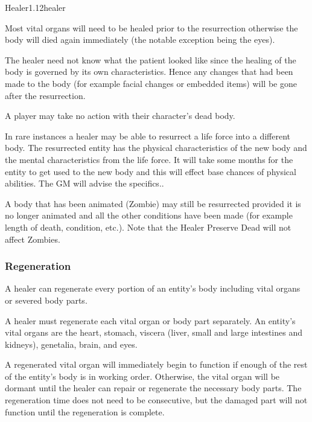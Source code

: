 \begin{skill*}{Healer}{1.12}{healer}
\begin{Enumerate}
\item
Most vital organs will need to be healed prior to the resurrection
otherwise the body will died again immediately (the notable exception
being the eyes).

\item
The healer need not know what the patient looked like since the
healing of the body is governed by its own characteristics. Hence any
changes that had been made to the body (for example facial changes or
embedded items) will be gone after the resurrection.

\item
A player may take no action with their character's dead body.

\item
In rare instances a healer may be able to resurrect a life force into
a different body. The resurrected entity has the physical
characteristics of the new body and the mental characteristics from
the life force.  It will take some months for the entity to get used
to the new body and this will effect base chances of physical
abilities.  The GM will advise the specifics..

\item
A body that has been animated (\eg Zombie) may still be resurrected
provided it is no longer animated and all the other conditions have
been made (for example length of death, condition, etc.). Note that
the Healer Preserve Dead will not affect Zombies.
\end{Enumerate}

\subsubsection{Regeneration}

A healer can regenerate every portion of an entity's body including
vital organs or severed body parts.

A healer must regenerate each vital organ or body part separately. An
entity's vital organs are the heart, stomach, viscera (liver, small
and large intestines and kidneys), genetalia, brain, and eyes.

A regenerated vital organ will immediately begin to function if enough
of the rest of the entity's body is in working order. Otherwise, the
vital organ will be dormant until the healer can repair or regenerate
the necessary body parts. The regeneration time does not need to be
consecutive, but the damaged part will not function until the
regeneration is complete.


\end{skill*}

